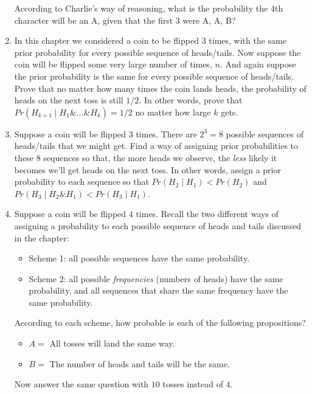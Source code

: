 \documentclass[justified]{tufte-book}
\providecommand{\tightlist}{%
  \setlength{\itemsep}{0pt}\setlength{\parskip}{0pt}}
\newcommand{\given}{\mid}
\renewcommand{\wedge}{\mathbin{\&}}
\newcommand{\p}{Pr}
\begin{document}
\begin{enumerate}
  According to Charlie's way of reasoning, what is the probability the \(4\)th character will be an A, given that the first \(3\) were A, A, B?
\item
  In this chapter we considered a coin to be flipped \(3\) times, with the same prior probability for every possible sequence of heads/tails. Now suppose the coin will be flipped some very large number of times, \(n\). And again suppose the prior probability is the same for every possible sequence of heads/tails. Prove that no matter how many times the coin lands heads, the probability of heads on the next toss is still \(1/2\). In other words, prove that \(\p(H_{k+1} \given H_1 \wedge \ldots \wedge H_{k}) = 1/2\) no matter how large \(k\) gets.
\item
  Suppose a coin will be flipped \(3\) times. There are \(2^3 = 8\) possible sequences of heads/tails that we might get. Find a way of assigning prior probabilities to these \(8\) sequences so that, the more heads we observe, the \emph{less} likely it becomes we'll get heads on the next toss. In other words, assign a prior probability to each sequence so that \(\p(H_2 \given H_1) < \p(H_2)\) and \(\p(H_3 \given H_2 \wedge H_1) < \p(H_3 \given H_1)\).
\item
  Suppose a coin will be flipped \(4\) times. Recall the two different ways of assigning a probability to each possible sequence of heads and tails discussed in the chapter:

  \begin{itemize}
  \tightlist
  \item
    Scheme 1: all possible sequences have the same probability.
  \item
    Scheme 2: all possible \emph{frequencies} (numbers of heads) have the same probability, and all sequences that share the same frequency have the same probability.
  \end{itemize}

  According to each scheme, how probable is each of the following propositions?

  \begin{itemize}
  \tightlist
  \item
    \(A =\) All tosses will land the same way.\\
  \item
    \(B =\) The number of heads and tails will be the same.
  \end{itemize}

  Now answer the same question with \(10\) tosses instead of \(4\).
\end{enumerate}
\end{document}
